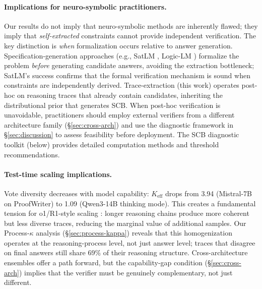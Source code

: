 \paragraph{Implications for neuro-symbolic practitioners.}
Our results do not imply that neuro-symbolic methods are inherently flawed; they imply that \emph{self-extracted} constraints cannot provide independent verification. The key distinction is \emph{when} formalization occurs relative to answer generation. Specification-generation approaches (e.g., SatLM \citep{ye2024satlm}, Logic-LM \citep{pan2023logiclm}) formalize the problem \emph{before} generating candidate answers, avoiding the extraction bottleneck; SatLM's success confirms that the formal verification mechanism is sound when constraints are independently derived. Trace-extraction (this work) operates post-hoc on reasoning traces that already contain candidates, inheriting the distributional prior that generates SCB. When post-hoc verification is unavoidable, practitioners should employ external verifiers from a different architecture family (\S\ref{sec:cross-arch}) and use the diagnostic framework in \S\ref{sec:discussion} to assess feasibility before deployment. The SCB diagnostic toolkit (below) provides detailed computation methods and threshold recommendations.

\paragraph{Test-time scaling implications.}
Vote diversity decreases with model capability: $K_\text{eff}$ drops from 3.94 (Mistral-7B on ProofWriter) to 1.09 (Qwen3-14B thinking mode). This creates a fundamental tension for o1/R1-style scaling \citep{guo2025deepseekr1}: longer reasoning chains produce more coherent but less diverse traces, reducing the marginal value of additional samples. Our Process-$\kappa$ analysis (\S\ref{sec:process-kappa}) reveals that this homogenization operates at the reasoning-process level, not just answer level; traces that disagree on final answers still share 69\% of their reasoning structure. Cross-architecture ensembles offer a path forward, but the capability-gap condition (\S\ref{sec:cross-arch}) implies that the verifier must be genuinely complementary, not just different.

